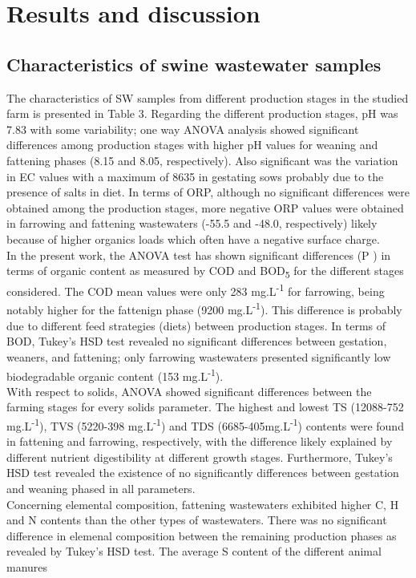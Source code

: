 \section{Results and discussion}
\subsection{Characteristics of swine wastewater samples}
The characteristics of SW samples from different production stages in the studied farm is presented in Table 3. Regarding the different production stages, pH was 7.83 with some variability; one way ANOVA analysis showed significant differences among production stages with higher pH values for weaning and fattening phases (8.15 and 8.05, respectively). Also significant was the variation in EC values with a maximum of 8635 in gestating sows probably due to the presence of salts in diet. In terms of ORP, although no significant differences were obtained among the production stages, more negative ORP values were obtained in farrowing and fattening wastewaters (-55.5 and -48.0, respectively) likely because of higher organics loads which often have a negative surface charge.\\
In the present work, the ANOVA test has shown significant differences (P ) in terms of organic content as measured by COD and BOD\textsubscript{5} for the different stages considered. The COD mean values were only 283 mg.L\textsuperscript{-1} for farrowing, being notably higher for the fattenign phase (9200 mg.L\textsuperscript{-1}). This difference is probably due to different feed strategies (diets) between production stages. In terms of BOD, Tukey’s HSD test revealed no significant differences between gestation, weaners, and fattening; only farrowing wastewaters presented significantly low biodegradable organic content (153 mg.L\textsuperscript{-1}).\\
With respect to solids, ANOVA showed significant differences between the farming stages for every solids parameter. The highest and lowest TS (12088-752 mg.L\textsuperscript{-1}), TVS (5220-398 mg.L\textsuperscript{-1}) and TDS (6685-405mg.L\textsuperscript{-1}) contents were found in fattening and farrowing, respectively, with the difference likely explained by different nutrient digestibility at different growth stages. Furthermore, Tukey’s HSD test revealed the existence of no significantly differences between gestation and weaning phased in all parameters.\\
Concerning elemental composition, fattening wastewaters exhibited higher C, H and N contents than the other types of wastewaters. There was no significant difference in elemenal composition between the remaining production phases as revealed by Tukey's HSD test. The average S content of the different animal manures